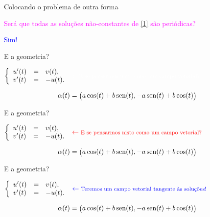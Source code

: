 \documentclass[11pt]{beamer}
\DeclareMathOperator{\sen}{sen}
\begin{document}
\begin{frame}{Colocando o problema de outra forma}

\textcolor{magenta}{Será que todas as soluções não-constantes de \eqref{1} são periódicas?}
\pause 
\begin{center}
\textcolor{blue}{Sim!}
\end{center}

\end{frame}




\begin{frame}[t]{E a geometria?}



$\left\{\begin{array}{lcl}
u'(t)&=&v(t),\\
v'(t)&=&-u(t).
\end{array}
\right. \ \textcolor{white}{{\footnotesize \textcolor{white}{\leftarrow}\text{E se pensarmos nisto como um campo vetorial?}}}
$

\[{\footnotesize \alpha(t)=\big(a\cos(t)+b\sen(t),-a\sen(t)+b\cos(t) \big)}\]



\end{frame}










\begin{frame}[t]{E a geometria?}



$\left\{\begin{array}{lcl}
u'(t)&=&v(t),\\
v'(t)&=&-u(t).
\end{array}
\right. \ \textcolor{red}{{\footnotesize \leftarrow\text{E se pensarmos nisto como um campo vetorial?}}}
$

\[{\footnotesize \alpha(t)=\big(a\cos(t)+b\sen(t),-a\sen(t)+b\cos(t) \big)}\]




\end{frame}



\begin{frame}[t]{E a geometria?}



$\left\{\begin{array}{lcl}
u'(t)&=&v(t),\\
v'(t)&=&-u(t).
\end{array}
\right. \ \textcolor{blue}{{\footnotesize \leftarrow\text{Teremos um campo vetorial tangente às soluções!}}}
$

\[{\footnotesize \alpha(t)=\big(a\cos(t)+b\sen(t),-a\sen(t)+b\cos(t) \big)}\]



\end{frame}
\end{document}
